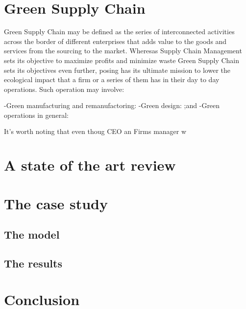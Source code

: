 \documentclass{article}
\begin{document}
\section{Green Supply Chain}
Green Supply Chain may be defined as the series of interconnected activities across the border of different enterprises that adds value to the goods and services from the sourcing to the market. Wheresas Supply Chain Management sets its objective to maximize profits and minimize waste Green Supply Chain sets its objectives even further, posing has its ultimate mission to lower the ecological impact that a firm or a series of them has in their day to day operations. Such operation may involve:

-Green manufacturing and remanufactoring: 
-Green design: ;and 
-Green operations in general:

It's worth noting that even thoug CEO an Firms manager w


\section{A state of the art review}

\section{The case study}
\subsection{The model}
\subsection{The results}

\section{Conclusion}
\end{document}
